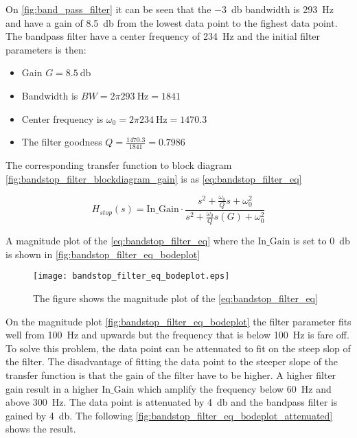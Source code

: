 On \autoref{fig:band_pass_filter} it can be seen that the \SI{-3}{\decibel} bandwidth is \SI{293}{\hertz} and have a gain of \SI{8.5}{\decibel} from the lowest data point to the fighest data point. The bandpass filter have a center frequency of \SI{234}{\hertz} and the initial filter parameters is then:

\begin{itemize}
\item Gain $G = \SI{8.5}{\decibel}$
\item Bandwidth is $BW = 2\pi \SI{293}{\hertz} = 1841$
\item Center frequency is $\omega_0 = 2\pi \SI{234}{\hertz} = 1470.3$
\item The filter goodness $Q = \frac{1470.3}{1841} = 0.7986$
\end{itemize}

The corresponding transfer function to block diagram \autoref{fig:bandstop_filter_blockdiagram_gain} is as \autoref{eq:bandstop_filter_eq}

\begin{equation}\label{eq:bandstop_filter_eq}
H_{stop}(s) = \text{In_Gain} \cdot \frac{s^2+\frac{\omega_0}{Q}s+\omega_0^2}{s^2+\frac{\omega_0}{Q}s(G)+\omega_0^2}
\end{equation}

    \startexplain
    \stopexplain


A magnitude plot of the \autoref{eq:bandstop_filter_eq} where the $\text{In_Gain}$ is set to \SI{0}{\decibel} is shown in \autoref{fig:bandstop_filter_eq_bodeplot}



\begin{figure}[H]
	\centering
	\texttt{[image: bandstop\_filter\_eq\_bodeplot.eps]}
	\caption{The figure shows the magnitude plot of the \autoref{eq:bandstop_filter_eq}}
		\label{fig:bandstop_filter_eq_bodeplot}
\end{figure}

On the magnitude plot  \autoref{fig:bandstop_filter_eq_bodeplot} the filter parameter fits well from \SI{100}{\hertz} and upwards but the frequency that is below \SI{100}{\hertz} is fare off. To solve this problem, the data point can be attenuated to fit on the steep slop of the filter. The disadvantage of fitting the data point to the steeper slope of the transfer function is that the gain of the filter have to be higher. A higher filter gain result in a higher $\text{In_Gain}$ which amplify the frequency below \SI{60}{\hertz} and above \SI{300}{\hertz}. The data point is attenuated by \SI{4}{\decibel} and the bandpass filter is gained by \SI{4}{\decibel}. The following \autoref{fig:bandstop_filter_eq_bodeplot_attenuated} shows the result.

